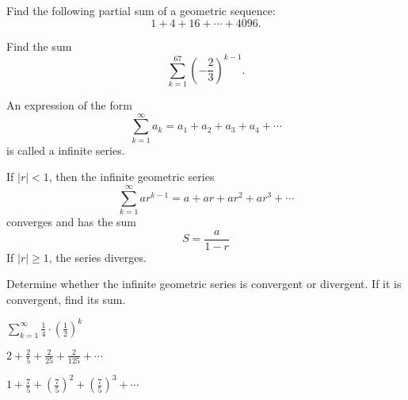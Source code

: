 \begin{example}
    Find the following partial sum of a geometric sequence:
\[1+4+16+\cdots+4096.\]
\end{example}

\begin{example}
    Find the sum 
    \[\sum\limits_{k=1}^67\left(-\frac23\right)^{k-1}.\]
\end{example}

\newpage

\begin{definition}
    An expression of the form
    \[\sum_{k=1}^\infty a_k= a_1 + a_2 + a_3 + a_4 + \cdots\]
is called a infinite series.
\end{definition}




\begin{theorem}
If $|r|<1$, then the infinite geometric series
$$
\sum_{k=1}^{\infty} a r^{k-1}=a+a r+a r^2+a r^3+\cdots
$$
converges and has the sum
$$
S=\frac{a}{1-r}
$$
If $|r| \geq 1$, the series diverges.
\end{theorem}


\begin{example}
Determine whether the infinite geometric series is convergent or divergent. If it is convergent, find its sum.\\
\begin{enumerate*}
  \item $\sum\limits_{k=1}^\infty\frac14\cdot\left(\frac12\right)^k$
    \item 
$2+\frac{2}{5}+\frac{2}{25}+\frac{2}{125}+\cdots$
\item
$1+\frac{7}{5}+\left(\frac{7}{5}\right)^2+\left(\frac{7}{5}\right)^3+\cdots$\hfill\null
\end{enumerate*}
\end{example}

